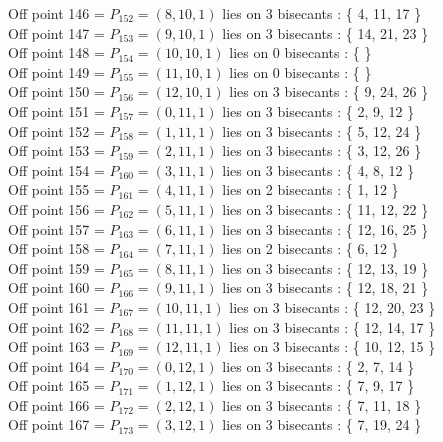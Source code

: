 \documentclass{article}
\begin{document}
{Off point 146 = $P_{152} = ( 8, 10, 1 )$ lies on 3 bisecants : \{ 4, 11, 17 \}\\
Off point 147 = $P_{153} = ( 9, 10, 1 )$ lies on 3 bisecants : \{ 14, 21, 23 \}\\
Off point 148 = $P_{154} = ( 10, 10, 1 )$ lies on 0 bisecants : \{  \}\\
Off point 149 = $P_{155} = ( 11, 10, 1 )$ lies on 0 bisecants : \{  \}\\
Off point 150 = $P_{156} = ( 12, 10, 1 )$ lies on 3 bisecants : \{ 9, 24, 26 \}\\
Off point 151 = $P_{157} = ( 0, 11, 1 )$ lies on 3 bisecants : \{ 2, 9, 12 \}\\
Off point 152 = $P_{158} = ( 1, 11, 1 )$ lies on 3 bisecants : \{ 5, 12, 24 \}\\
Off point 153 = $P_{159} = ( 2, 11, 1 )$ lies on 3 bisecants : \{ 3, 12, 26 \}\\
Off point 154 = $P_{160} = ( 3, 11, 1 )$ lies on 3 bisecants : \{ 4, 8, 12 \}\\
Off point 155 = $P_{161} = ( 4, 11, 1 )$ lies on 2 bisecants : \{ 1, 12 \}\\
Off point 156 = $P_{162} = ( 5, 11, 1 )$ lies on 3 bisecants : \{ 11, 12, 22 \}\\
Off point 157 = $P_{163} = ( 6, 11, 1 )$ lies on 3 bisecants : \{ 12, 16, 25 \}\\
Off point 158 = $P_{164} = ( 7, 11, 1 )$ lies on 2 bisecants : \{ 6, 12 \}\\
Off point 159 = $P_{165} = ( 8, 11, 1 )$ lies on 3 bisecants : \{ 12, 13, 19 \}\\
Off point 160 = $P_{166} = ( 9, 11, 1 )$ lies on 3 bisecants : \{ 12, 18, 21 \}\\
Off point 161 = $P_{167} = ( 10, 11, 1 )$ lies on 3 bisecants : \{ 12, 20, 23 \}\\
Off point 162 = $P_{168} = ( 11, 11, 1 )$ lies on 3 bisecants : \{ 12, 14, 17 \}\\
Off point 163 = $P_{169} = ( 12, 11, 1 )$ lies on 3 bisecants : \{ 10, 12, 15 \}\\
Off point 164 = $P_{170} = ( 0, 12, 1 )$ lies on 3 bisecants : \{ 2, 7, 14 \}\\
Off point 165 = $P_{171} = ( 1, 12, 1 )$ lies on 3 bisecants : \{ 7, 9, 17 \}\\
Off point 166 = $P_{172} = ( 2, 12, 1 )$ lies on 3 bisecants : \{ 7, 11, 18 \}\\
Off point 167 = $P_{173} = ( 3, 12, 1 )$ lies on 3 bisecants : \{ 7, 19, 24 \}\\
}
\end{document}
